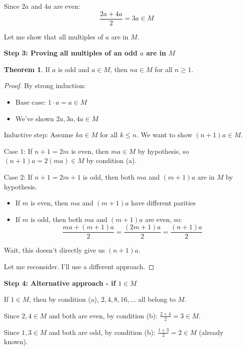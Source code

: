 \documentclass[12pt,a4paper]{article}
\theoremstyle{definition}
\newtheorem{theorem}{Theorem}
\begin{document}
        Since $2a$ and $4a$ are even:
        $$\frac{2a + 4a}{2} = 3a \in M$$

        Let me show that all multiples of $a$ are in $M$.

        \textbf{Step 3: Proving all multiples of an odd $a$ are in $M$}

        \begin{theorem}
            If $a$ is odd and $a \in M$, then $na \in M$ for all $n \geq 1$.
        \end{theorem}

        \begin{proof}
            By strong induction:
            \begin{itemize}
                \item Base case: $1 \cdot a = a \in M$ \checkmark
                \item We've shown $2a, 3a, 4a \in M$ \checkmark
            \end{itemize}

            Inductive step: Assume $ka \in M$ for all $k \leq n$. We want to show $(n+1)a \in M$.

            Case 1: If $n+1 = 2m$ is even, then $ma \in M$ by hypothesis, so $(n+1)a = 2(ma) \in M$ by condition (a).

            Case 2: If $n+1 = 2m+1$ is odd, then both $ma$ and $(m+1)a$ are in $M$ by hypothesis.
            \begin{itemize}
                \item If $m$ is even, then $ma$ and $(m+1)a$ have different parities
                \item If $m$ is odd, then both $ma$ and $(m+1)a$ are even, so:
                $$\frac{ma + (m+1)a}{2} = \frac{(2m+1)a}{2} = \frac{(n+1)a}{2}$$
            \end{itemize}

            Wait, this doesn't directly give us $(n+1)a$.

            Let me reconsider. I'll use a different approach.
        \end{proof}

        \textbf{Step 4: Alternative approach - if $1 \in M$}

        If $1 \in M$, then by condition (a), $2, 4, 8, 16, \ldots$ all belong to $M$.

        Since $2, 4 \in M$ and both are even, by condition (b): $\frac{2+4}{2} = 3 \in M$.

        Since $1, 3 \in M$ and both are odd, by condition (b): $\frac{1+3}{2} = 2 \in M$ (already known).
\end{document}
